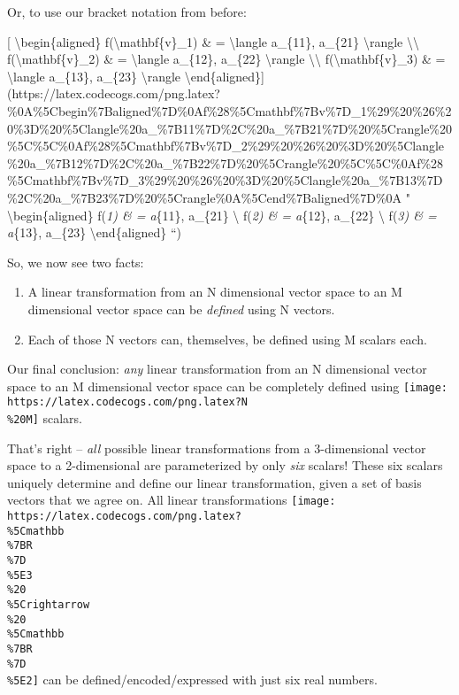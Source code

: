 \documentclass[]{article}
\begin{document}
Or, to use our bracket notation from before:

{[} \textbackslash{}begin\{aligned\} f(\textbackslash{}mathbf\{v\}\_1) \& =
\textbackslash{}langle a\_\{11\}, a\_\{21\} \textbackslash{}rangle
\textbackslash{}\textbackslash{} f(\textbackslash{}mathbf\{v\}\_2) \& =
\textbackslash{}langle a\_\{12\}, a\_\{22\} \textbackslash{}rangle
\textbackslash{}\textbackslash{} f(\textbackslash{}mathbf\{v\}\_3) \& =
\textbackslash{}langle a\_\{13\}, a\_\{23\} \textbackslash{}rangle
\textbackslash{}end\{aligned\}{]}(https://latex.codecogs.com/png.latex?\%0A\%5Cbegin\%7Baligned\%7D\%0Af\%28\%5Cmathbf\%7Bv\%7D\_1\%29\%20\%26\%20\%3D\%20\%5Clangle\%20a\_\%7B11\%7D\%2C\%20a\_\%7B21\%7D\%20\%5Crangle\%20\%5C\%5C\%0Af\%28\%5Cmathbf\%7Bv\%7D\_2\%29\%20\%26\%20\%3D\%20\%5Clangle\%20a\_\%7B12\%7D\%2C\%20a\_\%7B22\%7D\%20\%5Crangle\%20\%5C\%5C\%0Af\%28\%5Cmathbf\%7Bv\%7D\_3\%29\%20\%26\%20\%3D\%20\%5Clangle\%20a\_\%7B13\%7D\%2C\%20a\_\%7B23\%7D\%20\%5Crangle\%0A\%5Cend\%7Baligned\%7D\%0A
" \textbackslash{}begin\{aligned\} f(\emph{1) \& = \langle a}\{11\},
a\_\{21\} \rangle \textbackslash{} f(\emph{2) \& = \langle a}\{12\},
a\_\{22\} \rangle \textbackslash{} f(\emph{3) \& = \langle a}\{13\},
a\_\{23\} \rangle \textbackslash{}end\{aligned\} ``)

So, we now see two facts:

\begin{enumerate}
\def\labelenumi{\arabic{enumi}.}
\tightlist
\item
  A linear transformation from an N dimensional vector space to an M dimensional
  vector space can be \emph{defined} using N vectors.
\item
  Each of those N vectors can, themselves, be defined using M scalars each.
\end{enumerate}

Our final conclusion: \emph{any} linear transformation from an N dimensional
vector space to an M dimensional vector space can be completely defined using
\texttt{[image: https://latex.codecogs.com/png.latex?N\\\%20M]} scalars.

That's right -- \emph{all} possible linear transformations from a 3-dimensional
vector space to a 2-dimensional are parameterized by only \emph{six} scalars!
These six scalars uniquely determine and define our linear transformation, given
a set of basis vectors that we agree on. All linear transformations
\texttt{[image: https://latex.codecogs.com/png.latex?\\\%5Cmathbb\\\%7BR\\\%7D\\\%5E3\\\%20\\\%5Crightarrow\\\%20\\\%5Cmathbb\\\%7BR\\\%7D\\\%5E2]}
can be defined/encoded/expressed with just six real numbers.
\end{document}
